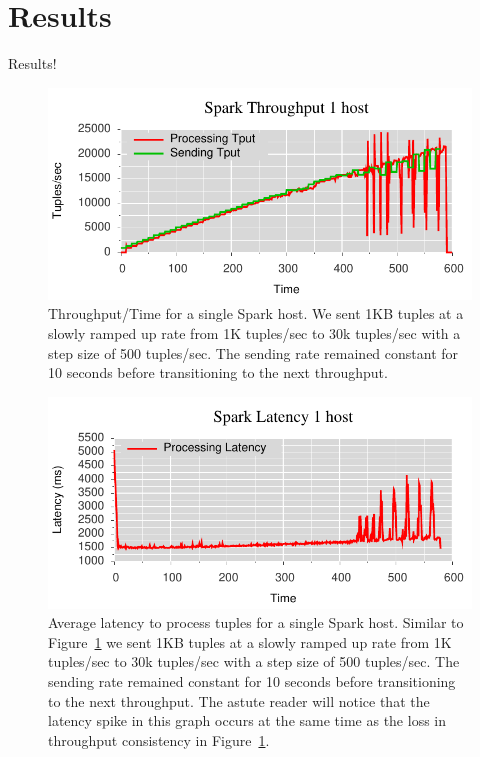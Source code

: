 \section{Results}
Results!

\begin{figure}[t]
\centering
\includegraphics[width=1\linewidth]{figures/sp1_tput.pdf}
\caption{Throughput/Time for a single Spark host. We sent 1KB tuples at a slowly ramped up rate from 1K tuples/sec to 30k tuples/sec with a step size of 500 tuples/sec. The sending rate remained constant for 10 seconds before transitioning to the next throughput.}
\label{fig:sb1-tput}
\end{figure}

\begin{figure}[t]
\centering
\includegraphics[width=1\linewidth]{figures/sp1_latency.pdf}
\caption{Average latency to process tuples for a single Spark host. Similar to
Figure~\ref{fig:sb1-tput} we sent 1KB tuples at a slowly ramped up rate from 1K
tuples/sec to 30k tuples/sec with a step size of 500 tuples/sec. The sending
rate remained constant for 10 seconds before transitioning to the next
throughput. The astute reader will notice that the latency spike in this graph
occurs at the same time as the loss in throughput consistency in
Figure~\ref{fig:sb1-tput}.}
\label{fig:label-me-if-you-want}
\end{figure}

